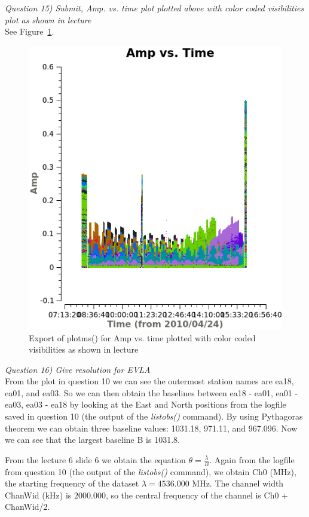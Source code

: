 \documentclass[12pt, a4paper]{article}
\begin{document}
\newpage

\noindent \textit{Question 15) Submit, Amp. vs. time plot plotted above with color coded visibilities plot as shown in lecture} \\
See Figure~\ref{fig:15}. \\

\begin{figure}
    \centering
    \includegraphics[scale=0.65]{../Imaging/plots/amp_vs_time_vraag15.png}
    \caption{Export of plotms() for Amp vs. time plotted with color coded visibilities as shown in lecture \label{fig:15}}
\end{figure}

\noindent \textit{Question 16) Give resolution for EVLA} \\
From the plot in question 10 we can see the outermost station names are ea18, ea01, and ea03. So we can then obtain the baselines between ea18 - ea01, ea01 - ea03, ea03 - ea18 by looking at the East and North positions from the logfile saved in question 10 (the output of the \emph{listobs()} command). By using Pythagoras theorem we can obtain three baseline values: 1031.18, 971.11, and 967.096. Now we can see that the largest baseline B is 1031.8.

From the lecture 6 slide 6 we obtain the equation $\theta = \frac{\lambda}{B}$. Again from the logfile from question 10 (the output of the \emph{listobs()} command), we obtain Ch0 (MHz), the starting frequency of the dataset $\lambda = 4536.000$ MHz. The channel width ChanWid (kHz) is $2000.000$, so the central frequency of the channel is Ch0 + ChanWid/2.
\end{document}
